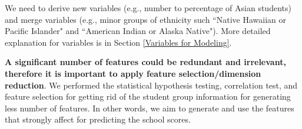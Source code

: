 \documentclass[11pt]{article}
\begin{document}

%
We need to derive new variables (e.g., number to percentage of Asian students) and merge variables (e.g., minor groups of ethnicity such ``Native Hawaiian or Pacific Islander" and ``American Indian or Alaska Native"). More detailed explanation for variables is in Section \ref{Variables for Modeling}.

\textbf{A significant number of features could be redundant and irrelevant, therefore it is important to apply feature selection/dimension reduction}.
%
We performed the statistical hypothesis testing, correlation test, and feature selection for
getting rid of the student group information for generating less number of features. In other words, we aim to generate and use the features that strongly affect for predicting the school scores.
\end{document}
